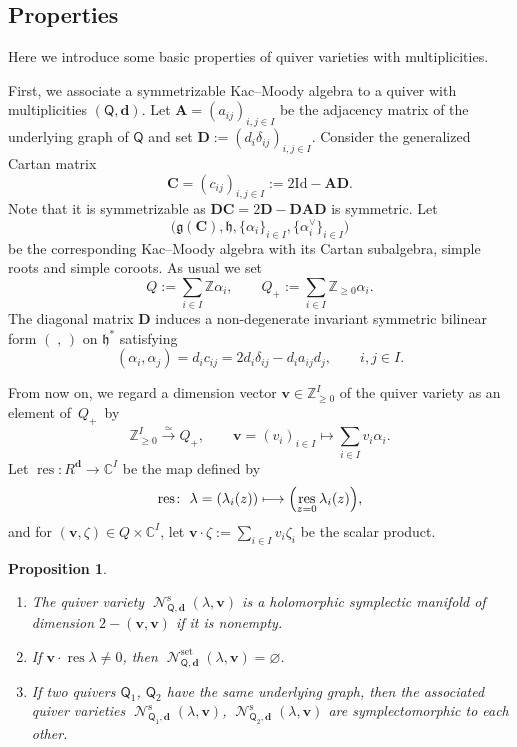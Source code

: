 \documentclass[11pt]{article}
\numberwithin{equation}{section}
\newtheorem{Proposition}[Theorem]{Proposition}
\theoremstyle{definition}
\newcommand{\Z}{\mathbb{Z}} %
\newcommand{\C}{\mathbb{C}} %
\newcommand{\g}{\mathfrak{g}} %
\newcommand{\h}{\mathfrak{h}} %
\newcommand{\unit}{\mathrm{Id}}
\newcommand{\bA}{\mathbf{A}} %
\newcommand{\bD}{\mathbf{D}} %
\newcommand{\bC}{\mathbf{C}} %
\newcommand{\bv}{\mathbf{v}}
\newcommand{\res}{\operatorname*{res}}
\newcommand{\ved}{\mathbf{d}}
\newcommand{\Qst}{\operatorname{\mathscr{N}}^\mathrm{s}}
\newcommand{\Qset}{\operatorname{\mathscr{N}}^\mathrm{set}}
\newcommand{\QQ}{\mathsf{Q}} %
\begin{document}
\subsection{Properties}\label{subsec:property}

Here we introduce some basic properties of quiver varieties
with multiplicities.

First, we associate a symmetrizable Kac--Moody algebra
to a quiver with multiplicities $(\QQ,\ved)$.
Let $\bA=(a_{ij})_{i,j \in I}$ be the adjacency matrix of
the underlying graph of $\QQ$ and
set $\bD := (d_i\delta_{ij})_{i,j \in I}$.
Consider the generalized Cartan matrix
\[
\bC=(c_{ij})_{i,j \in I} := 2 \unit - \bA \bD.
\]
Note that it is symmetrizable as $\bD \bC = 2 \bD - \bD \bA \bD$
is symmetric.
Let
\[
\bigl( \g(\bC), \h, \{ \alpha_i \}_{i \in I}, \{ \alpha_i^\vee \}_{i \in I}
\bigr)
\]
be the corresponding Kac--Moody algebra
with its Cartan subalgebra, simple roots and simple coroots.
As usual we set
\[
Q := \sum_{i \in I} \Z \alpha_i, \qquad
Q_+ := \sum_{i \in I} \Z_{\geq 0} \alpha_i.
\]
The diagonal matrix $\bD$
induces a non-degenerate invariant symmetric bilinear form
$(\; , \,)$
on $\h^*$ satisfying
\[
( \alpha_i, \alpha_j) = d_i c_{ij}
= 2 d_i \delta_{ij} - d_i a_{ij} d_j,
\qquad  i,j \in I.
\]

From now on, we regard a dimension vector $\bv \in \Z_{\geq 0}^I$
of the quiver variety as an element of~$Q_+$~by
\[
\Z_{\geq 0}^I \xrightarrow{\simeq} Q_+,
\qquad \bv=(v_i)_{i \in I} \mapsto \sum_{i \in I} v_i \alpha_i.
\]
Let $\res \colon R^\ved \to \C^I$ be the map def\/ined by
\[
\res \colon \ \lambda=(\lambda_i(z)) \longmapsto
\Bigl( \res_{z=0} \lambda_i(z) \Bigr),
\]
and for $(\bv, \zeta) \in Q \times \C^I$,
let $\bv \cdot \zeta := \sum\limits_{i \in I} v_i \zeta_i$
be the scalar product.

\begin{Proposition}\label{prop:dim}\qquad
\begin{enumerate}\itemsep=0pt
\item[{\rm (i)}] The quiver variety $\Qst_{\QQ,\ved}(\lambda,\bv)$
is a holomorphic symplectic manifold of dimension
$2 -(\bv, \bv)$ if it is nonempty.

\item[{\rm (ii)}] If $\bv \cdot \res \lambda \neq 0$,
then $\Qset_{\QQ,\ved}(\lambda,\bv) = \varnothing$.

\item[{\rm (iii)}] If two quivers $\QQ_1$, $\QQ_2$ have the same underlying graph,
then the associated quiver varieties
$\Qst_{\QQ_1,\ved}(\lambda,\bv)$, $\Qst_{\QQ_2,\ved}(\lambda,\bv)$
are symplectomorphic to each other.
\end{enumerate}
\end{Proposition}
\end{document}
